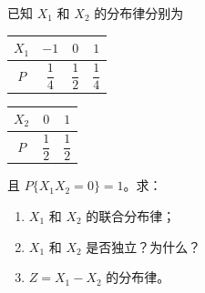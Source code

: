 ﻿\documentclass[lang=cn,11pt]{elegantbook}
\begin{document}
\begin{exercise}[联合分布的确定与独立性] \label{exer:3-3b}
已知 $X_1$ 和 $X_2$ 的分布律分别为
\begin{center}
\begin{tabular}{c|ccc}
$X_1$ & $-1$ & $0$ & $1$ \\
\midrule
$P$ & $\dfrac{1}{4}$ & $\dfrac{1}{2}$ & $\dfrac{1}{4}$
\end{tabular}
\quad
\begin{tabular}{c|cc}
$X_2$ & $0$ & $1$ \\
\midrule
$P$ & $\dfrac{1}{2}$ & $\dfrac{1}{2}$
\end{tabular}
\end{center}
且 $P\{X_1 X_2 = 0\} = 1$。求：
\begin{enumerate}
    \item[(1)] $X_1$ 和 $X_2$ 的联合分布律；
    \item[(2)] $X_1$ 和 $X_2$ 是否独立？为什么？
    \item[(3)] $Z = X_1 - X_2$ 的分布律。
\end{enumerate}
\end{exercise}
\end{document}
